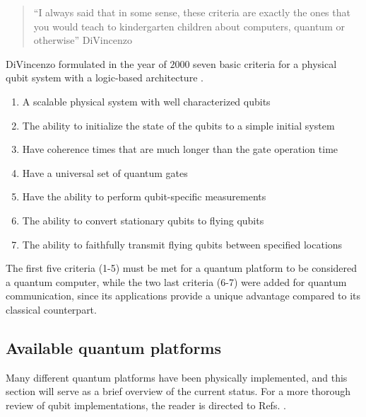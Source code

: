 \begin{quote}
   ``I always said that in some sense, these criteria are exactly the ones that you would teach to kindergarten children about computers, quantum or otherwise'' DiVincenzo \cite{Georgescu2020}
\end{quote}

DiVincenzo formulated in the year of $2000$ seven basic criteria for a physical qubit system with a logic-based architecture \cite{DiVincenzo2000}.

\begin{enumerate}
  \item A scalable physical system with well characterized qubits
  \item The ability to initialize the state of the qubits to a simple initial system
  \item Have coherence times that are much longer than the gate operation time
  \item Have a universal set of quantum gates
  \item Have the ability to perform qubit-specific measurements
  \item The ability to convert stationary qubits to flying qubits
  \item The ability to faithfully transmit flying qubits between specified locations
\end{enumerate}

The first five criteria (1-5) must be met for a quantum platform to be considered a quantum computer, while the two last criteria (6-7) were added for quantum communication, since its applications provide a unique advantage compared to its classical counterpart.

\subsection{Available quantum platforms}


Many different quantum platforms have been physically implemented, and this section will serve as a brief overview of the current status. For a more thorough review of qubit implementations, the reader is directed to Refs. \cite{Ladd2010, Acin2018}. \\


